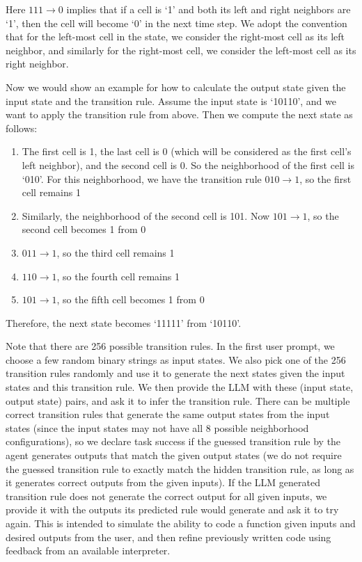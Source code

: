 Here $111 \rightarrow 0$ implies that if a cell is `1' and both its left and right neighbors are `1', then the cell will become `0' in the next time step.  We adopt the convention that for the left-most cell in the state, we consider the right-most cell as its left neighbor, and similarly for the right-most cell, we consider the left-most cell as its right neighbor. 

Now we would show an example for how to calculate the output state given the input state and the transition rule. Assume the input state is `10110', and we want to apply the transition rule from above. Then we compute the next state as follows:

\begin{enumerate}
    \item The first cell is 1, the last cell is 0 (which will be considered as the first cell's left neighbor), and the second cell is 0. So the neighborhood of the first cell is `010'. For this neighborhood, we have the transition rule $010 \rightarrow 1$, so the first cell remains 1
    \item Similarly, the neighborhood of the second cell is 101. Now $101 \rightarrow 1$, so the second cell becomes 1 from 0
    \item $011 \rightarrow 1$, so the third cell remains 1
    \item $110 \rightarrow 1$, so the fourth cell remains 1
    \item $101 \rightarrow 1$, so the fifth cell becomes 1 from 0
\end{enumerate}

Therefore, the next state becomes `11111' from `10110'. 

Note that there are 256 possible transition rules. In the first user prompt, we choose a few random binary strings as input states. We also pick one of the 256 transition rules randomly and use it to generate the next states given the input states and this transition rule. We then provide the LLM with these (input state, output state) pairs, and ask it to infer the transition rule. There can be multiple correct transition rules that generate the same output states from the input states (since the input states may not have all 8 possible neighborhood configurations), so we declare task success if the guessed transition rule by the agent generates outputs that match the given output states (we do not require the guessed transition rule to exactly match the hidden transition rule, as long as it generates correct outputs from the given inputs). If the LLM generated transition rule does not generate the correct output for all given inputs, we provide it with the outputs its predicted rule would generate and ask it to try again. This is intended to simulate the ability to code a function given inputs and desired outputs from the user, and then refine previously written code using feedback from an available interpreter.

